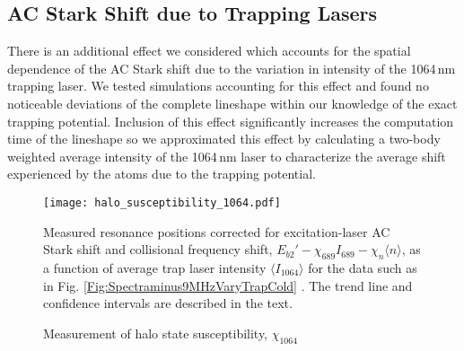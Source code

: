 %








\subsection{AC Stark Shift due to Trapping Lasers}

There is an additional effect we considered which accounts for the spatial dependence of the AC Stark shift due to the variation in intensity of the 1064\,nm trapping laser.
We tested simulations accounting for this effect and found no noticeable deviations of the complete lineshape within our knowledge of the exact trapping potential.
Inclusion of this effect significantly increases the computation time of the lineshape so we approximated this effect by calculating a two-body weighted average intensity of the 1064\,nm laser to characterize the average shift experienced by the atoms due to the trapping potential.

	\begin{figure} 
	 \centerline{
	 \texttt{[image: halo\_susceptibility\_1064.pdf]}}
	  \caption{Measurement of halo state susceptibility, $\chi_{1064}$}{Measured resonance positions corrected for excitation-laser AC Stark shift and collisional frequency shift, $E_{b2}'-\chi_{689} I_{689} - \chi_{n}\langle n\rangle$, as a function of average trap laser intensity $\langle I_{1064} \rangle$ for the data such as in Fig. \ref{Fig:Spectraminus9MHzVaryTrapCold} . The trend line and confidence intervals are described in the text.}
	  \label{Fig:ShiftWithTrapIntensity}
	\end{figure}

